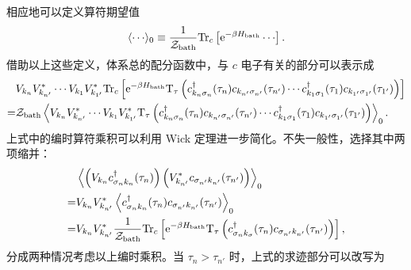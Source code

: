 相应地可以定义算符期望值 
\begin{equation}
    \lag\cdots\rag_0\equiv \frac{1}{\mathcal{Z}_{\fun{bath}}}\fun{Tr}_c\lmi \e^{-\beta H_{\fun{bath}}}\cdots \rmi.
\end{equation}
借助以上这些定义，体系总的配分函数中，与 $c$ 电子有关的部分可以表示成 
\begin{equation}
    \begin{aligned}
        &V_{k_n}V_{k_{n'}}^*\cdots V_{k_1}V_{k_{1'}}^*\mathrm{Tr}_c \left[ \mathrm{e}^{-\beta H_{\mathrm{bath}}}\mathrm{T}_\tau \left( c_{k_n\sigma_n}^\dagger(\tau_n)c_{k_{n'}\sigma_{n'}}(\tau_{n'})\cdots c_{k_1\sigma_1}^\dagger(\tau_1)c_{k_{1'}\sigma_{1'}}(\tau_{1'}) \right) \right]\\
        =&\mathcal{Z}_{\mathrm{bath}}\left\langle V_{k_n}V_{k_{n'}}^*\cdots V_{k_1}V_{k_{1'}}^* \mathrm{T}_{\tau}\left( c_{k_n\sigma_n}^\dagger(\tau_n)c_{k_{n'}\sigma_{n'}}(\tau_{n'})\cdots c_{k_1\sigma_1}^\dagger (\tau_1)c_{k_{1'}\sigma_{1'}}(\tau_{1'}) \right) \right\rangle_0.
    \end{aligned}
    \label{trace-c}
\end{equation}
上式中的编时算符乘积可以利用 Wick 定理进一步简化。不失一般性，选择其中两项缩并： 
\begin{equation}
    \begin{aligned}
        &\left\langle\left( V_{k_n}c_{\sigma_n k_n}^\dagger (\tau_n) \right) \left( V_{k_{n'}}^* c_{\sigma_{n'}k_{n'}}(\tau_{n'}) \right)\right\rangle_0\\
        =& V_{k_n}V_{k_{n'}}^*\left\langle c_{\sigma_nk_n}^\dagger (\tau_n)c_{\sigma_{n'}k_{n'}}(\tau_{n'}) \right\rangle_0\\
        =& V_{k_n}V_{k_{n'}}^*\frac{1}{\mathcal{Z}_{\mathrm{bath}}}\mathrm{Tr}_c\left[ \mathrm{e}^{-\beta H_{\mathrm{bath}}}\mathrm{T}_\tau \left( c_{\sigma_n k_\sigma}^\dagger (\tau_n) c_{\sigma_{n'}k_{n'}}(\tau_{n'}) \right) \right],
    \end{aligned}
\end{equation}
分成两种情况考虑以上编时乘积。当 $\tau_n>\tau_{n'}$ 时，上式的求迹部分可以改写为
